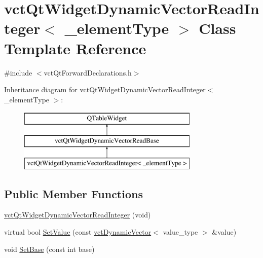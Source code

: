 \hypertarget{classvct_qt_widget_dynamic_vector_read_integer}{\section{vct\-Qt\-Widget\-Dynamic\-Vector\-Read\-Integer$<$ \-\_\-element\-Type $>$ Class Template Reference}
\label{classvct_qt_widget_dynamic_vector_read_integer}
}


{\ttfamily \#include $<$vct\-Qt\-Forward\-Declarations.\-h$>$}

Inheritance diagram for vct\-Qt\-Widget\-Dynamic\-Vector\-Read\-Integer$<$ \-\_\-element\-Type $>$\-:\begin{figure}[H]
\begin{center}
\leavevmode
\includegraphics[height=3.000000cm]{db/df1/classvct_qt_widget_dynamic_vector_read_integer}
\end{center}
\end{figure}
\subsection*{Public Member Functions}
\begin{DoxyCompactItemize}
\item 
\hyperlink{classvct_qt_widget_dynamic_vector_read_integer_a2964417ce6c2001c22527ec246d41648}{vct\-Qt\-Widget\-Dynamic\-Vector\-Read\-Integer} (void)
\item 
virtual bool \hyperlink{classvct_qt_widget_dynamic_vector_read_integer_ad4f251712e6c6771401e8e667c23b89b}{Set\-Value} (const \hyperlink{classvct_dynamic_vector}{vct\-Dynamic\-Vector}$<$ value\-\_\-type $>$ \&value)
\item 
void \hyperlink{classvct_qt_widget_dynamic_vector_read_integer_a2dc32b2047bd4c96f0e5d6e1b0262f23}{Set\-Base} (const int base)
\end{DoxyCompactItemize}


